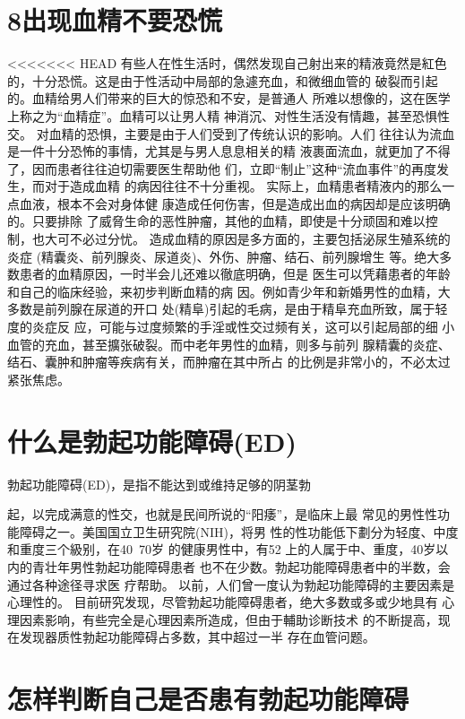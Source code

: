 \documentclass[12pt,UTF8]{ctexbook}
\begin{document}
\section{8出现血精不要恐慌}
<<<<<<< HEAD
有些人在性生活时，偶然发现自己射出来的精液竟然是紅色
的，十分恐慌。这是由于性活动中局部的急遽充血，和微细血管的
破裂而引起的。血精给男人们带来的巨大的惊恐和不安，是普通人
所难以想像的，这在医学上称之为“血精症”。血精可以让男人精
神消沉、对性生活没有情趣，甚至恐惧性交。
对血精的恐惧，主要是由于人们受到了传统认识的影响。人们
往往认为流血是一件十分恐怖的事情，尤其是与男人息息相关的精
液裹面流血，就更加了不得了，因而患者往往迫切需要医生帮助他
们，立即“制止”这种“流血事件”的再度发生，而对于造成血精
的病因往往不十分重视。
实际上，血精患者精液内的那么一点血液，根本不会对身体健
康造成任何伤害，但是造成出血的病因却是应该明确的。只要排除
了威脅生命的恶性肿瘤，其他的血精，即使是十分顽固和难以控
制，也大可不必过分忧。
造成血精的原因是多方面的，主要包括泌尿生殖系统的炎症
(精囊炎、前列腺炎、尿道炎)、外伤、肿瘤、结石、前列腺增生
等。绝大多数患者的血精原因，一时半会儿还难以徹底明确，但是
医生可以凭藉患者的年龄和自己的临床经验，来初步判断血精的病
因。例如青少年和新婚男性的血精，大多数是前列腺在尿道的开口
处(精阜)引起的毛病，是由于精阜充血所致，属于轻度的炎症反
应，可能与过度频繁的手淫或性交过频有关，这可以引起局部的细
小血管的充血，甚至擴张破裂。而中老年男性的血精，则多与前列
腺精囊的炎症、结石、囊肿和肿瘤等疾病有关，而肿瘤在其中所占
的比例是非常小的，不必太过紧张焦虑。
\section{什么是勃起功能障碍(ED)}
勃起功能障碍(ED)，是指不能达到或维持足够的阴茎勃

起，以完成满意的性交，也就是民间所说的“阳痿”，是临床上最
常见的男性性功能障碍之一。美国国立卫生研究院(NIH)，将男
性的性功能低下劃分为轻度、中度和重度三个級别，在40~70岁
的健康男性中，有52%
上的人属于中、重度，40岁以内的青壮年男性勃起功能障碍患者
也不在少数。勃起功能障碍患者中的半数，会通过各种途径寻求医
疗帮助。
以前，人们曾一度认为勃起功能障碍的主要因素是心理性的。
目前研究发现，尽管勃起功能障碍患者，绝大多数或多或少地具有
心理因素影响，有些完全是心理因素所造成，但由于輔助诊断技术
的不断提高，现在发现器质性勃起功能障碍占多数，其中超过一半
存在血管问题。

\section{怎样判断自己是否患有勃起功能障碍}
\end{document}
